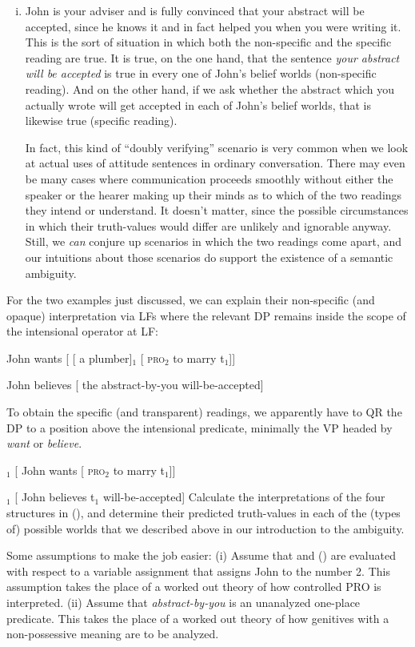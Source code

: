 \begin{enumerate}[(i)]
\item John is your adviser and is fully convinced that your abstract will be
  accepted, since he knows it and in fact helped you when you were writing it.
  This is the sort of situation in which both the non-specific and the specific
  reading are true. It is true, on the one hand, that the sentence \emph{your
    abstract will be accepted} is true in every one of John's belief worlds
  (non-specific reading). And on the other hand, if we ask whether the abstract
  which you actually wrote will get accepted in each of John's belief worlds,
  that is likewise true (specific reading).
	
	In fact, this kind of ``doubly verifying'' scenario is very common when we
  look at actual uses of attitude sentences in ordinary conversation. There may
  even be many cases where communication proceeds smoothly without either the
  speaker or the hearer making up their minds as to which of the two readings
  they intend or understand. It doesn't matter, since the possible circumstances
  in which their truth-values would differ are unlikely and ignorable anyway.
  Still, we \emph{can} conjure up scenarios in which the two readings come
  apart, and our intuitions about those scenarios do support the existence of a
  semantic ambiguity.
  
\end{enumerate}

\begin{exercise}

For the two examples just discussed, we can explain their non-specific (and
opaque) interpretation via LFs where the relevant DP remains inside the scope of
the intensional operator at LF:

\ex\label{first} John wants [ [ a plumber]$_1$ [ \textsc{pro}$_2$ to marry
t$_1$]] \xe

\ex John believes [ the abstract-by-you will-be-accepted] \xe

To obtain the specific (and transparent) readings, we apparently have to QR the
DP to a position above the intensional predicate, minimally the VP headed by
\emph{want} or \emph{believe}.

\ex\null [ a plumber]$_1$ [ John wants [ \textsc{pro}$_2$ to marry t$_1$]] \xe

\ex{}$_1$ [ John believes t$_1$ will-be-accepted] \xe
%	
Calculate the interpretations of the four structures in \dash(\lastx),
and determine their predicted truth-values in each of the (types of) possible
worlds that we described above in our introduction to the ambiguity.
	
Some assumptions to make the job easier: (i) Assume that  and (\blastx)
are evaluated with respect to a variable assignment that assigns John to the
number 2. This assumption takes the place of a worked out theory of how
controlled PRO is interpreted. (ii) Assume that \emph{abstract-by-you} is an
unanalyzed one-place predicate. This takes the place of a worked out theory of
how genitives with a non-possessive meaning are to be analyzed. \eex
\end{exercise}

